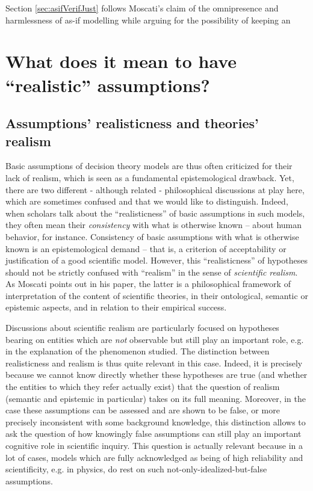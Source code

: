 \documentclass[a4paper,11pt]{article}
\theoremstyle{definition}
\begin{document}
Section \ref{sec:asifVerifJust} follows Moscati's claim of the omnipresence and harmlessness of as-if modelling while arguing for the possibility of keeping an

\section{What does it mean to have ``realistic'' assumptions?}
\label{sec:realisticness}
\subsection{Assumptions' realisticness and theories' realism}


Basic assumptions of decision theory models are thus often criticized for their lack of realism, which is seen as a fundamental epistemological drawback. Yet, there are two different - although related - philosophical discussions at play here, which are sometimes confused and that we would like to distinguish. Indeed, when scholars talk about the ``realisticness'' of basic assumptions in such models, they often mean their \textit{consistency} with what is otherwise known -- about human behavior, for instance. Consistency of basic assumptions with what is otherwise known is an epistemological demand -- that is, a criterion of acceptability or justification of a good scientific model. However, this ``realisticness'' of hypotheses should not be strictly confused with ``realism'' in the sense of \textit{scientific realism}. As Moscati points out in his paper, the latter is a philosophical framework of interpretation of the content of scientific theories, in their ontological, semantic or epistemic aspects, and in relation to their empirical success. 

Discussions about scientific realism are particularly focused on hypotheses bearing on entities which are \textit{not} observable but still play an important role, e.g. in the explanation of the phenomenon studied. The distinction between realisticness and realism is thus quite relevant in this case. Indeed, it is precisely because we cannot know directly whether these hypotheses are true (and whether the entities to which they refer actually exist) that the question of realism (semantic and epistemic in particular) takes on its full meaning. Moreover, in the case these assumptions can be assessed and are shown to be false, or more precisely inconsistent with some background knowledge, this distinction allows to ask the question of how knowingly false assumptions can still play an important cognitive role in scientific inquiry. This question is actually relevant because in a lot of cases, models which are fully acknowledged as being of high reliability and scientificity, e.g. in physics, do rest on such not-only-idealized-but-false assumptions. 
\end{document}
